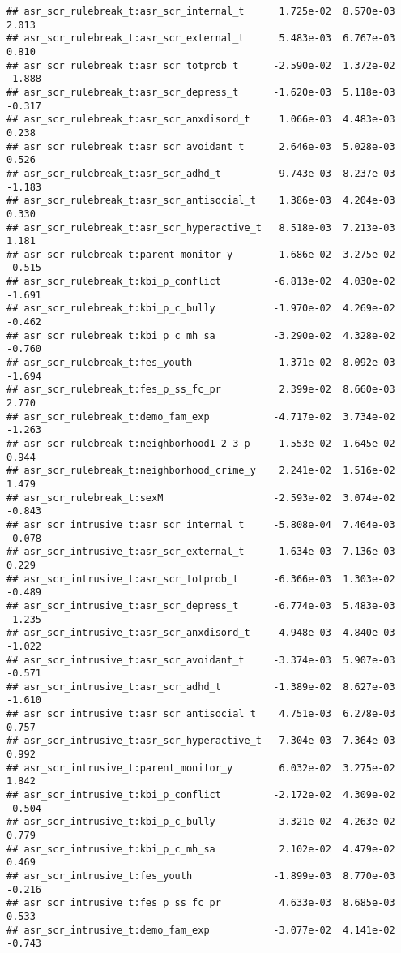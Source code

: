 \documentclass[
]{article}
\begin{document}
\begin{verbatim}
## asr_scr_rulebreak_t:asr_scr_internal_t      1.725e-02  8.570e-03   2.013
## asr_scr_rulebreak_t:asr_scr_external_t      5.483e-03  6.767e-03   0.810
## asr_scr_rulebreak_t:asr_scr_totprob_t      -2.590e-02  1.372e-02  -1.888
## asr_scr_rulebreak_t:asr_scr_depress_t      -1.620e-03  5.118e-03  -0.317
## asr_scr_rulebreak_t:asr_scr_anxdisord_t     1.066e-03  4.483e-03   0.238
## asr_scr_rulebreak_t:asr_scr_avoidant_t      2.646e-03  5.028e-03   0.526
## asr_scr_rulebreak_t:asr_scr_adhd_t         -9.743e-03  8.237e-03  -1.183
## asr_scr_rulebreak_t:asr_scr_antisocial_t    1.386e-03  4.204e-03   0.330
## asr_scr_rulebreak_t:asr_scr_hyperactive_t   8.518e-03  7.213e-03   1.181
## asr_scr_rulebreak_t:parent_monitor_y       -1.686e-02  3.275e-02  -0.515
## asr_scr_rulebreak_t:kbi_p_conflict         -6.813e-02  4.030e-02  -1.691
## asr_scr_rulebreak_t:kbi_p_c_bully          -1.970e-02  4.269e-02  -0.462
## asr_scr_rulebreak_t:kbi_p_c_mh_sa          -3.290e-02  4.328e-02  -0.760
## asr_scr_rulebreak_t:fes_youth              -1.371e-02  8.092e-03  -1.694
## asr_scr_rulebreak_t:fes_p_ss_fc_pr          2.399e-02  8.660e-03   2.770
## asr_scr_rulebreak_t:demo_fam_exp           -4.717e-02  3.734e-02  -1.263
## asr_scr_rulebreak_t:neighborhood1_2_3_p     1.553e-02  1.645e-02   0.944
## asr_scr_rulebreak_t:neighborhood_crime_y    2.241e-02  1.516e-02   1.479
## asr_scr_rulebreak_t:sexM                   -2.593e-02  3.074e-02  -0.843
## asr_scr_intrusive_t:asr_scr_internal_t     -5.808e-04  7.464e-03  -0.078
## asr_scr_intrusive_t:asr_scr_external_t      1.634e-03  7.136e-03   0.229
## asr_scr_intrusive_t:asr_scr_totprob_t      -6.366e-03  1.303e-02  -0.489
## asr_scr_intrusive_t:asr_scr_depress_t      -6.774e-03  5.483e-03  -1.235
## asr_scr_intrusive_t:asr_scr_anxdisord_t    -4.948e-03  4.840e-03  -1.022
## asr_scr_intrusive_t:asr_scr_avoidant_t     -3.374e-03  5.907e-03  -0.571
## asr_scr_intrusive_t:asr_scr_adhd_t         -1.389e-02  8.627e-03  -1.610
## asr_scr_intrusive_t:asr_scr_antisocial_t    4.751e-03  6.278e-03   0.757
## asr_scr_intrusive_t:asr_scr_hyperactive_t   7.304e-03  7.364e-03   0.992
## asr_scr_intrusive_t:parent_monitor_y        6.032e-02  3.275e-02   1.842
## asr_scr_intrusive_t:kbi_p_conflict         -2.172e-02  4.309e-02  -0.504
## asr_scr_intrusive_t:kbi_p_c_bully           3.321e-02  4.263e-02   0.779
## asr_scr_intrusive_t:kbi_p_c_mh_sa           2.102e-02  4.479e-02   0.469
## asr_scr_intrusive_t:fes_youth              -1.899e-03  8.770e-03  -0.216
## asr_scr_intrusive_t:fes_p_ss_fc_pr          4.633e-03  8.685e-03   0.533
## asr_scr_intrusive_t:demo_fam_exp           -3.077e-02  4.141e-02  -0.743

\end{verbatim}
\end{document}
